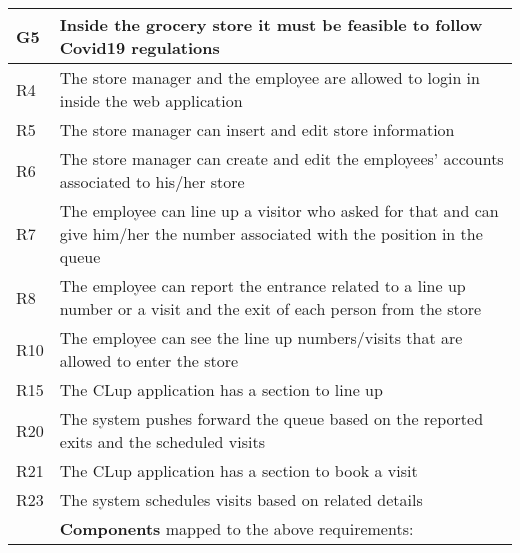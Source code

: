 \begin{center}
    {\renewcommand{\arraystretch}{1.5}
    \begin{longtable}{L{2.5cm}L{12cm}}
        \hline
        \textbf{G5} & \textbf{Inside the grocery store it must be feasible to follow Covid19 regulations} \\
        \hline
         R4 & The store manager and the employee are allowed to login in inside the web application \\
        \hline
         R5 & The store manager can insert and edit store information \\
        \hline
         R6 & The store manager can create and edit the employees’ accounts associated to his/her store \\
        \hline
         R7 & The employee can line up a visitor who asked for that and can give him/her the number associated with the position in the queue \\
        \hline
         R8 & The employee can report the entrance related to a line up number or a visit and the exit of each person from the store \\
        \hline
         R10 & The employee can see the line up numbers/visits that are allowed to enter the store \\
        \hline
         R15 & The CLup application has a section to line up \\
        \hline
         R20 & The system pushes forward the queue based on the reported exits and the scheduled visits \\
        \hline
         R21 & The CLup application has a section to book a visit \\
        \hline
         R23 & The system schedules visits based on related details \\
        \hline
         & \textbf{Components} mapped to the above requirements:


\end{longtable}}
\end{center}
